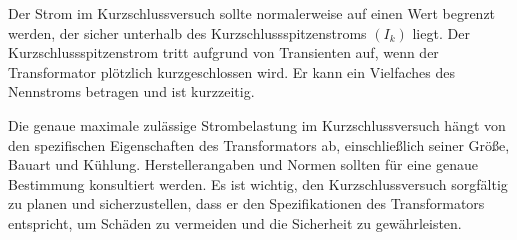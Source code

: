 \begin{enumerate}[label=\alph*)]
	      Der Strom im Kurzschlussversuch sollte normalerweise auf einen Wert begrenzt
	      werden, der sicher unterhalb des Kurzschlussspitzenstroms $(I_{k})$ liegt. Der
	      Kurzschlussspitzenstrom tritt aufgrund von Transienten auf, wenn der
	      Transformator plötzlich kurzgeschlossen wird. Er kann ein Vielfaches des
	      Nennstroms betragen und ist kurzzeitig.

	      Die genaue maximale zulässige Strombelastung im Kurzschlussversuch hängt von
	      den spezifischen Eigenschaften des Transformators ab, einschließlich seiner
	      Größe, Bauart und Kühlung. Herstellerangaben und Normen sollten für eine genaue
	      Bestimmung konsultiert werden. Es ist wichtig, den Kurzschlussversuch
	      sorgfältig zu planen und sicherzustellen, dass er den Spezifikationen des
	      Transformators entspricht, um Schäden zu vermeiden und die Sicherheit zu
	      gewährleisten.


\end{enumerate}

